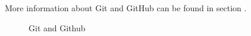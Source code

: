 More information about Git and GitHub can be found in section \label{subsec:git}.

\begin{figure}[H]
	\centering
	\caption{Git and Github}
\end{figure}
